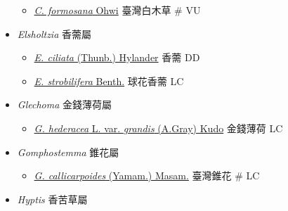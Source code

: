 \begin{itemize}
  \begin{itemize}
        \item[] \href{http://www.theplantlist.org/tpl1.1/search?q=Comanthosphace+formosana}{\textit{C. formosana} Ohwi}   臺灣白木草  \# VU
  \end{itemize}
 \item[] \textit{Elsholtzia} 香薷屬
                                
  \begin{itemize}
        \item[] \href{http://www.theplantlist.org/tpl1.1/search?q=Elsholtzia+ciliata}{\textit{E. ciliata} (Thunb.) Hylander}   香薷   DD
        \item[] \href{http://www.theplantlist.org/tpl1.1/search?q=Elsholtzia+strobilifera}{\textit{E. strobilifera} Benth.}   球花香薷   LC
  \end{itemize}
 \item[] \textit{Glechoma} 金錢薄荷屬
                                
  \begin{itemize}
        \item[] \href{http://www.theplantlist.org/tpl1.1/search?q=Glechoma+hederacea+var.+grandis}{\textit{G. hederacea} L. var. \textit{grandis} (A.Gray) Kudo}   金錢薄荷   LC
  \end{itemize}
 \item[] \textit{Gomphostemma} 錐花屬
                                
  \begin{itemize}
        \item[] \href{http://www.theplantlist.org/tpl1.1/search?q=Gomphostemma+callicarpoides}{\textit{G. callicarpoides} (Yamam.) Masam.}   臺灣錐花  \# LC
  \end{itemize}
 \item[] \textit{Hyptis} 香苦草屬
                                

\end{itemize}
